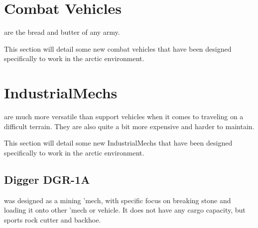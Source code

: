 \documentclass{tufte-book}
\begin{document}
\chapter{Combat Vehicles}
\label{ch:combat-vehicles}


 are the bread and butter of any army.

This section will detail some new combat vehicles that have been
designed specifically to work in the arctic environment.





\chapter{IndustrialMechs}
\label{ch:industrialmechs}


 are much more versatile than support vehicles
when it comes to traveling on a difficult terrain. They are also quite
a bit more expensive and harder to maintain.

This section will detail some new IndustrialMechs that have been
designed specifically to work in the arctic environment.


\section{Digger DGR-1A}
 was designed as a mining 'mech, with specific focus
on breaking stone and loading it onto other 'mech or vehicle. It does not
have any cargo capacity, but sports rock cutter and backhoe.

\end{document}
